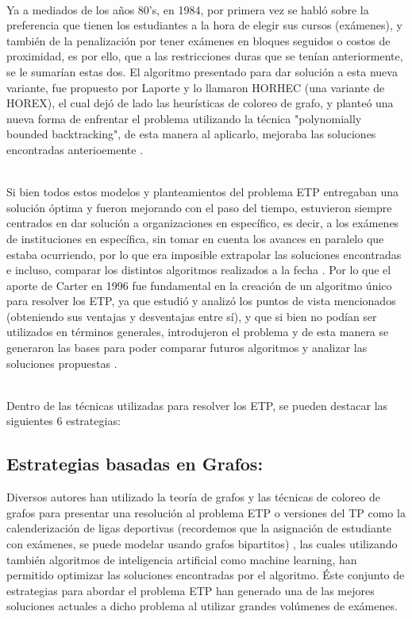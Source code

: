 \begin{itemize}
\end{itemize}
\\
Ya a mediados de los años 80's, en 1984, por primera vez se habló sobre la preferencia que tienen los estudiantes a la hora de elegir sus cursos (exámenes), y también de la penalización por tener exámenes en bloques seguidos o costos de proximidad, es por ello, que a las restricciones duras que se tenían anteriormente, se le sumarían estas dos. El algoritmo presentado para dar solución a esta nueva variante, fue propuesto por Laporte y lo llamaron HORHEC (una variante de HOREX), el cual dejó de lado las heurísticas de coloreo de grafo, y planteó una nueva forma de enfrentar el problema utilizando la técnica "polynomially bounded
backtracking", de esta manera al aplicarlo, mejoraba las soluciones encontradas anterioemente \cite{Cita13}.
\begin{itemize}
\end{itemize}
\\
Si bien todos estos modelos y planteamientos del problema ETP entregaban una solución óptima y fueron mejorando con el paso del tiempo, estuvieron siempre centrados en dar solución a organizaciones en específico, es decir, a los exámenes de instituciones en específica, sin tomar en cuenta los avances en paralelo que estaba ocurriendo, por lo que era imposible extrapolar las soluciones encontradas e incluso, comparar los distintos algoritmos realizados a la fecha \cite{Cita14}. Por lo que el aporte de Carter en 1996 fue fundamental en la creación de un algoritmo único para resolver los ETP, ya que estudió y analizó los puntos de vista mencionados (obteniendo sus ventajas y desventajas entre sí), y que si bien no podían ser utilizados en términos generales, introdujeron el problema y de esta manera se generaron las bases para poder comparar futuros algoritmos y analizar las soluciones propuestas \cite{Cita15}. 
\begin{itemize}
\end{itemize}
\\
Dentro de las técnicas utilizadas para resolver los ETP, se pueden destacar las siguientes 6 estrategias:

\subsection{Estrategias basadas en Grafos:}
Diversos autores han utilizado la teoría de grafos y las técnicas de coloreo de grafos para presentar una resolución al problema ETP o versiones del TP como la calenderización de ligas deportivas (recordemos que la asignación de estudiante con exámenes, se puede modelar usando grafos bipartitos) \cite{Cita16}, las cuales utilizando también algoritmos de inteligencia artificial como machine learning, han permitido optimizar las soluciones encontradas por el algoritmo. Éste conjunto de estrategias para abordar el problema ETP han generado una de las mejores soluciones actuales a dicho problema al utilizar grandes volúmenes de exámenes.

